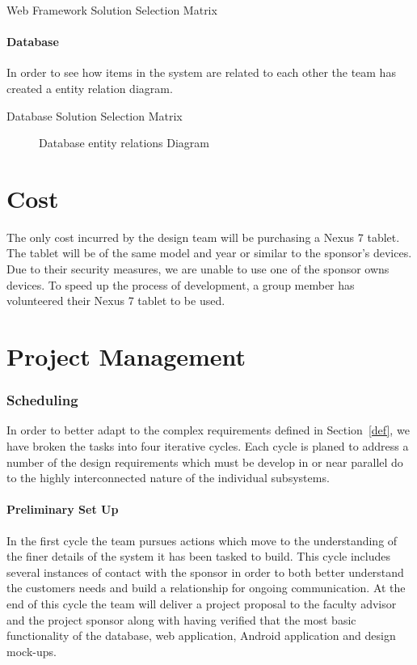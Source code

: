 \documentclass[Letter,11pt]{article}
\begin{document}
		
	
		\begin{table}[h]
			\centering
			
			\caption{\label{WebMatrix} Web Framework Solution Selection Matrix}
		\end{table}
	
	
	\subsection{Database}
		In order to see how items in the system are related to each other the team has created a entity relation diagram.
		\begin{table}[h]
			\centering
			
			\caption{\label{DBMatrix} Database Solution Selection Matrix}
		\end{table}
		
		\begin{figure}[h]
			\centering
			
			\caption{\label{ERdiogram} Database entity relations Diagram}
		\end{figure}
	

		
	
\part{Cost}
The only cost incurred by the design team will be purchasing a Nexus 7 tablet. The tablet will be of the same model and year or similar to the sponsor's devices.  Due to their security measures, we are unable to use one of the sponsor owns devices. To speed up the process of development, a group member has volunteered their Nexus 7 tablet to be used.
\part{Project Management}
\section{Scheduling}
		In order to better adapt to the complex requirements defined in Section~\ref{def}, we have broken the tasks into four iterative cycles. Each cycle is planed to address a number of the design requirements which must be develop in or near parallel do to the highly interconnected nature of the individual subsystems. 
		
		
	\subsection{Preliminary Set Up}\label{cyc1}
		In the first cycle the team pursues actions which move to the understanding of the finer details of the system it has been tasked to build. This cycle includes several instances of contact with the sponsor in order to both better understand the customers needs and build a relationship for ongoing communication. At the end of this cycle the team will deliver a project proposal to the faculty advisor and the project sponsor along with having verified that the most basic functionality of the database, web application, Android application and design mock-ups. 
		
\end{document}
